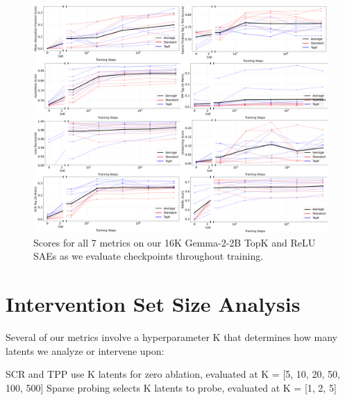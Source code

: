 \documentclass{article}
\theoremstyle{plain}
\theoremstyle{definition}
\theoremstyle{remark}
\begin{document}
\begin{figure}[h!]
    \centering
    \includegraphics[width=\columnwidth]{images/all_checkpoints.png}
    \caption{Scores for all 7 metrics on our 16K Gemma-2-2B TopK and ReLU SAEs as we evaluate checkpoints throughout training.}
\end{figure}
\label{fig:plot_all_checkpoints}

\clearpage
\section{Intervention Set Size Analysis}
\label{app:intervention_set_size}
Several of our metrics involve a hyperparameter K that determines how many latents we analyze or intervene upon:

SCR and TPP use K latents for zero ablation, evaluated at K = [5, 10, 20, 50, 100, 500]
Sparse probing selects K latents to probe, evaluated at K = [1, 2, 5]
\end{document}

